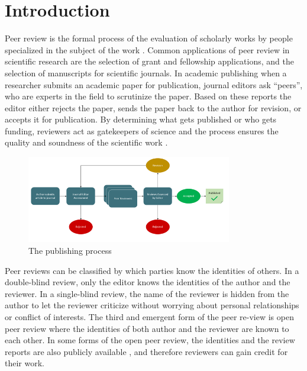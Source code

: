
\chapter{Introduction}\label{chapter:introduction}
Peer review is the formal process of the evaluation of scholarly works by people specialized in the subject of the work \parencite[p.~864]{Moxham.2018}. Common applications of peer review in scientific research are the selection of grant and fellowship applications, and the selection of manuscripts for scientific journals. In academic publishing when a researcher submits an academic paper for publication, journal editors ask “peers”, who are experts in the field to scrutinize the paper. Based on these reports the editor either rejects the paper, sends the paper back to the author for revision, or accepts it for publication. By determining what gets published or who gets funding, reviewers act as gatekeepers of science and the process ensures the quality and soundness of the scientific work \parencite{Bornmann.2011}.

\begin{figure}[htpb]
  \centering
  \includegraphics[width=0.8\textwidth]{figures/publishing-process.png}
  \caption{The publishing process} \label{fig:publishing-process}
\end{figure}

Peer reviews can be classified by which parties know the identities of others. In a double-blind review, only the editor knows the identities of the author and the reviewer. In a single-blind review, the name of the reviewer is hidden from the author to let the reviewer criticize without worrying about personal relationships or conflict of interests. The third and emergent form of the peer re-view is open peer review where the identities of both author and the reviewer are known to each other. In some forms of the open peer review, the identities and the review reports are also publicly available \parencite[4]{HorbachS.P.J.M..2017}, and therefore reviewers can gain credit for their work. 

